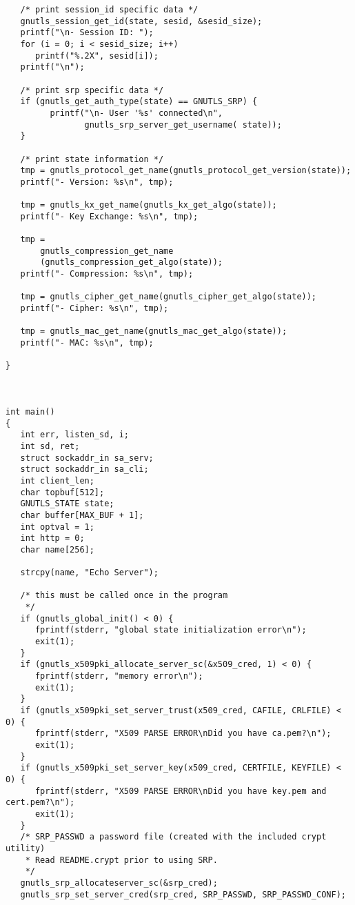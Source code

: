 \begin{verbatim}
   /* print session_id specific data */
   gnutls_session_get_id(state, sesid, &sesid_size);
   printf("\n- Session ID: ");
   for (i = 0; i < sesid_size; i++)
      printf("%.2X", sesid[i]);
   printf("\n");

   /* print srp specific data */
   if (gnutls_get_auth_type(state) == GNUTLS_SRP) {
         printf("\n- User '%s' connected\n",
                gnutls_srp_server_get_username( state));
   }

   /* print state information */
   tmp = gnutls_protocol_get_name(gnutls_protocol_get_version(state));
   printf("- Version: %s\n", tmp);

   tmp = gnutls_kx_get_name(gnutls_kx_get_algo(state));
   printf("- Key Exchange: %s\n", tmp);

   tmp =
       gnutls_compression_get_name
       (gnutls_compression_get_algo(state));
   printf("- Compression: %s\n", tmp);

   tmp = gnutls_cipher_get_name(gnutls_cipher_get_algo(state));
   printf("- Cipher: %s\n", tmp);

   tmp = gnutls_mac_get_name(gnutls_mac_get_algo(state));
   printf("- MAC: %s\n", tmp);

}



int main()
{
   int err, listen_sd, i;
   int sd, ret;
   struct sockaddr_in sa_serv;
   struct sockaddr_in sa_cli;
   int client_len;
   char topbuf[512];
   GNUTLS_STATE state;
   char buffer[MAX_BUF + 1];
   int optval = 1;
   int http = 0;
   char name[256];

   strcpy(name, "Echo Server");

   /* this must be called once in the program
    */
   if (gnutls_global_init() < 0) {
      fprintf(stderr, "global state initialization error\n");
      exit(1);
   }
   if (gnutls_x509pki_allocate_server_sc(&x509_cred, 1) < 0) {
      fprintf(stderr, "memory error\n");
      exit(1);
   }
   if (gnutls_x509pki_set_server_trust(x509_cred, CAFILE, CRLFILE) < 0) {
      fprintf(stderr, "X509 PARSE ERROR\nDid you have ca.pem?\n");
      exit(1);
   }
   if (gnutls_x509pki_set_server_key(x509_cred, CERTFILE, KEYFILE) < 0) {
      fprintf(stderr, "X509 PARSE ERROR\nDid you have key.pem and cert.pem?\n");
      exit(1);
   }
   /* SRP_PASSWD a password file (created with the included crypt utility) 
    * Read README.crypt prior to using SRP.
    */
   gnutls_srp_allocateserver_sc(&srp_cred);
   gnutls_srp_set_server_cred(srp_cred, SRP_PASSWD, SRP_PASSWD_CONF);



\end{verbatim}

